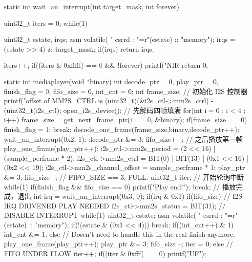 \begin{CodeBlock}[language=BookC]
static int wait_an_interrupt(int target_mask, int forever)
{
    uint32_t iters = 0;
    while(1) {
        uint32_t estate, irqs;
        asm volatile(
		"	csrrd	%
		: "=r"(estate) :: "memory");
        irqs = (estate >> 4) & target_mask;
        if(irqs){
            return irqs;
        }

        iters++;
        if((iters & 0xfffff) == 0 && !forever) {
            printf("NIR%
            return 0;
        }
    }
}

static int mediaplayer(void *binary)
{
    int decode_ptr = 0, play_ptr = 0, finish_flag = 0, fifo_size = 0, int_cnt = 0;
    int frame_size;
    // 初始化 I2S 控制器
    printf("offset of MM2S_CTRL is %
           (uint32_t)(&i2s_ctl->mm2s_ctrl) - (uint32_t)i2s_ctl);
    open_i2s_device();
    // 先解码四帧填满
    for(int i = 0 ; i < 4 ; i++) {
        frame_size = get_next_frame_ptr(i == 0, &binary);
        if(frame_size == 0) {
            finish_flag = 1;
            break;
        }
        decode_one_frame(frame_size,binary,decode_ptr++);
        wait_an_interrupt(0x2, 1);
        decode_ptr &= 3;
        fifo_size++;
    }
    // 之后播放第一帧
    play_one_frame(play_ptr++);
    i2s_ctl->mm2s_period = (2 << 16) | (sample_perframe * 2);
    i2s_ctl->mm2s_ctrl = BIT(0) | BIT(13) | (0x1 << 16) | (0x2 << 19);
    i2s_ctl->mm2s_channel_offset = sample_perframe * 1;
    play_ptr &= 3;
    fifo_size --;
    // FIFO_SIZE == 3, FULL.
    uint32_t iter;
    // 开始轮询中断
    while(1) {
        if(finish_flag && fifo_size == 0) {
            printf("Play end!\n");
            break;
        } // 播放完成，退出
        int irq = wait_an_interrupt(0x3, 0);
        if(irq & 0x1) {
            if(fifo_size) {
                // I2S IRQ DRIVENED PLAY NEEDED
                i2s_ctl->mm2s_status = BIT(31); // DISABLE INTERRUPT
                while(1) {
                    uint32_t estate;
                    asm volatile(
                        "	csrrd	%
                        : "=r"(estate) :: "memory");
                    if(!(estate & (0x1 << 4))) break;
                }
                if((int_cnt++) & 1) {
                    int_cnt &= 1;
                } else {// Dosen't need to handle this in the real finish anymore.
                    play_one_frame(play_ptr++);
                    play_ptr &= 3;
                    fifo_size --;
                    iter = 0;
                }
            } else {
                // FIFO UNDER FLOW
                iter++;
                if((iter & 0xfff) == 0) printf("UF\n");
}}}}
\end{CodeBlock}
